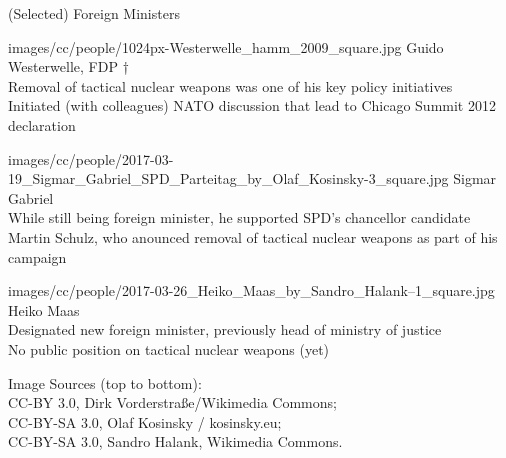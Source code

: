 \documentclass[presentation]{beamer}
\begin{document}
\begin{frame}[label={sec:org73db639}]{(Selected) Foreign Ministers}
\begin{imagebox3rows}[fontlower=\scriptsize,lefthand width=2.1cm]{images/cc/people/1024px-Westerwelle_hamm_2009_square.jpg}
\alert{Guido Westerwelle, FDP †} \\
\tinyscriptsize
Removal of tactical nuclear weapons was one of his key policy initiatives \\[0.2em]
Initiated (with colleagues) NATO discussion that lead to Chicago Summit 2012 declaration
\end{imagebox3rows}

\begin{imagebox3rows}[fontlower=\scriptsize,lefthand width=2.1cm]{images/cc/people/2017-03-19_Sigmar_Gabriel_SPD_Parteitag_by_Olaf_Kosinsky-3_square.jpg}
\alert{Sigmar Gabriel} \\
\tinyscriptsize
While still being foreign minister, he supported SPD's chancellor candidate Martin Schulz, who anounced removal of tactical nuclear weapons as part of his campaign  \\[0.2em]
\end{imagebox3rows}

\begin{imagebox3rows}[fontlower=\scriptsize,lefthand width=2.1cm]{images/cc/people/2017-03-26_Heiko_Maas_by_Sandro_Halank–1_square.jpg}
\alert{Heiko Maas} \\
\tinyscriptsize
Designated new foreign minister, previously head of ministry of justice \\[0.2em]
No public position on tactical nuclear weapons (yet)
\end{imagebox3rows}

\vvtiny Image Sources (top to bottom): \\
 CC-BY 3.0, Dirk Vorderstraße/Wikimedia Commons; \\
CC-BY-SA 3.0, Olaf Kosinsky / kosinsky.eu; \\
CC-BY-SA 3.0, Sandro Halank, Wikimedia Commons.
\end{frame}
\end{document}
